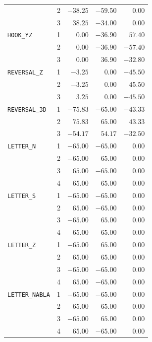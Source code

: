 \documentclass[12pt]{report}
\begin{document}
\begin{table}[htbp]
\begin{tabular}{lcrrr}
         & 2 & $-38.25$ & $-59.50$ & $0.00$\\
         & 3 & $38.25$ & $-34.00$ & $0.00$\\
        \addlinespace[3pt]
        \texttt{HOOK\_YZ} & 1 & $0.00$ & $-36.90$ & $57.40$\\
         & 2 & $0.00$ & $-36.90$ & $-57.40$\\
         & 3 & $0.00$ & $36.90$ & $-32.80$\\
        \addlinespace[3pt]
        \texttt{REVERSAL\_Z} & 1 & $-3.25$ & $0.00$ & $-45.50$\\
         & 2 & $-3.25$ & $0.00$ & $45.50$\\
         & 3 & $3.25$ & $0.00$ & $-45.50$\\
        \addlinespace[3pt]
        \texttt{REVERSAL\_3D} & 1 & $-75.83$ & $-65.00$ & $-43.33$\\
         & 2 & $75.83$ & $65.00$ & $43.33$\\
         & 3 & $-54.17$ & $54.17$ & $-32.50$\\
        \midrule
        \texttt{LETTER\_N} & 1 & $-65.00$ & $-65.00$ & $0.00$\\
         & 2 & $-65.00$ & $65.00$ & $0.00$\\
         & 3 & $65.00$ & $-65.00$ & $0.00$\\
         & 4 & $65.00$ & $65.00$ & $0.00$\\
        \addlinespace[3pt]
        \texttt{LETTER\_S} & 1 & $-65.00$ & $-65.00$ & $0.00$\\
         & 2 & $65.00$ & $-65.00$ & $0.00$\\
         & 3 & $-65.00$ & $65.00$ & $0.00$\\
         & 4 & $65.00$ & $65.00$ & $0.00$\\
        \addlinespace[3pt]
        \texttt{LETTER\_Z} & 1 & $-65.00$ & $65.00$ & $0.00$\\
         & 2 & $65.00$ & $65.00$ & $0.00$\\
         & 3 & $-65.00$ & $-65.00$ & $0.00$\\
         & 4 & $65.00$ & $-65.00$ & $0.00$\\
        \addlinespace[3pt]
        \texttt{LETTER\_NABLA} & 1 & $-65.00$ & $-65.00$ & $0.00$\\
         & 2 & $65.00$ & $65.00$ & $0.00$\\
         & 3 & $-65.00$ & $65.00$ & $0.00$\\
         & 4 & $65.00$ & $-65.00$ & $0.00$\\
        \bottomrule
    \end{tabular}
\end{table}
\end{document}
